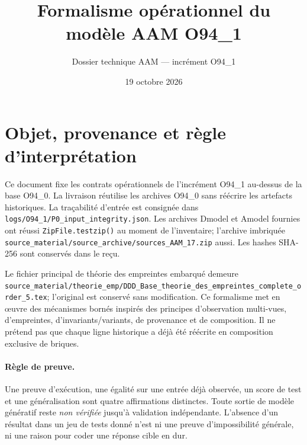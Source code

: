 \documentclass[11pt,a4paper]{article}
\title{Formalisme opérationnel du modèle AAM O94\_1}
\author{Dossier technique AAM — incrément O94\_1}
\date{19 octobre 2026}
\begin{document}
\maketitle
\tableofcontents
\newpage

\section{Objet, provenance et règle d'interprétation}
Ce document fixe les contrats opérationnels de l'incrément O94\_1 au-dessus de la base O94\_0. La livraison réutilise les archives O94\_0 sans réécrire les artefacts historiques. La traçabilité d'entrée est consignée dans \texttt{logs/O94\_1/P0\_input\_integrity.json}. Les archives Dmodel et Amodel fournies ont réussi \texttt{ZipFile.testzip()} au moment de l'inventaire; l'archive imbriquée \texttt{source\_material/source\_archive/sources\_AAM\_17.zip} aussi. Les hashes SHA-256 sont conservés dans le reçu.

Le fichier principal de théorie des empreintes embarqué demeure \texttt{source\_material/theorie\_emp/DDD\_Base\_theorie\_des\_empreintes\_complete\_order\_5.tex}; l'original est conservé sans modification. Ce formalisme met en œuvre des mécanismes bornés inspirés des principes d'observation multi-vues, d'empreintes, d'invariants/variants, de provenance et de composition. Il ne prétend pas que chaque ligne historique a déjà été réécrite en composition exclusive de briques.

\paragraph{Règle de preuve.} Une preuve d'exécution, une égalité sur une entrée déjà observée, un score de test et une généralisation sont quatre affirmations distinctes. Toute sortie de modèle génératif reste \emph{non vérifiée} jusqu'à validation indépendante. L'absence d'un résultat dans un jeu de tests donné n'est ni une preuve d'impossibilité générale, ni une raison pour coder une réponse cible en dur.
\end{document}
